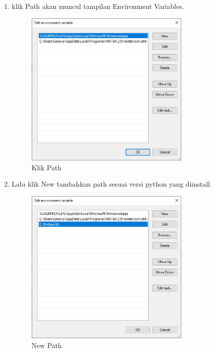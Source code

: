 \begin{enumerate}
	\item klik Path akan muncul tampilan Environment Variables. 
		\begin{figure}[!htpb]
			\includegraphics[width=8cm]{figures/10.PNG}
			\centering
			\caption{Klik Path}
		\end{figure}
	\newpage
	\item Lalu klik New tambahkan path sesuai versi python yang diinstall
		\begin{figure}[!htpb]
			\includegraphics[width=8cm]{figures/11.PNG}
			\centering
			\caption{New Path}
		\end{figure}
\end{enumerate}

